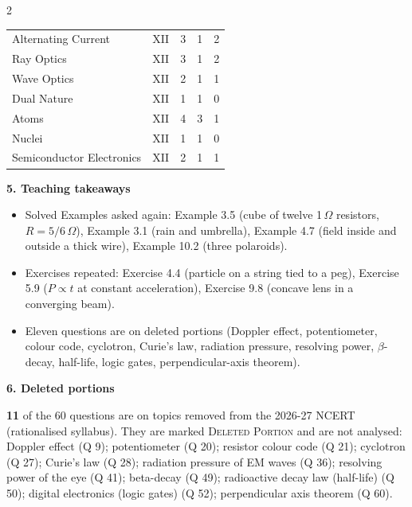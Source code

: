 \begin{multicols}{2}
{\begin{tabular}{@{}p{4.7cm}c@{\,}r@{\,}r@{\,}r@{}}
Alternating Current & XII & 3 & 1 & 2\\
Ray Optics & XII & 3 & 1 & 2\\
Wave Optics & XII & 2 & 1 & 1\\
Dual Nature & XII & 1 & 1 & 0\\
Atoms & XII & 4 & 3 & 1\\
Nuclei & XII & 1 & 1 & 0\\
Semiconductor Electronics & XII & 2 & 1 & 1\\
\bottomrule\end{tabular}}\par\medskip
\textbf{\color{crimson}5. Teaching takeaways}\par\smallskip
{\footnotesize\begin{itemize}[leftmargin=1em,nosep]
\item Solved Examples asked again: Example 3.5 (cube of twelve 1\,$\Omega$ resistors, $R=5/6\,\Omega$), Example 3.1 (rain and umbrella), Example 4.7 (field inside and outside a thick wire), Example 10.2 (three polaroids).
\item Exercises repeated: Exercise 4.4 (particle on a string tied to a peg), Exercise 5.9 ($P\propto t$ at constant acceleration), Exercise 9.8 (concave lens in a converging beam).
\item Eleven questions are on deleted portions (Doppler effect, potentiometer, colour code, cyclotron, Curie's law, radiation pressure, resolving power, $\beta$-decay, half-life, logic gates, perpendicular-axis theorem).
\end{itemize}}\par\medskip
\textbf{\color{crimson}6. Deleted portions}\par\smallskip
\textbf{11} of the 60 questions are on topics removed from the 2026-27 NCERT (rationalised syllabus). They are marked \textsc{Deleted Portion} and are not analysed: Doppler effect (Q 9); potentiometer (Q 20); resistor colour code (Q 21); cyclotron (Q 27); Curie's law (Q 28); radiation pressure of EM waves (Q 36); resolving power of the eye (Q 41); beta-decay (Q 49); radioactive decay law (half-life) (Q 50); digital electronics (logic gates) (Q 52); perpendicular axis theorem (Q 60).\par
\end{multicols}








